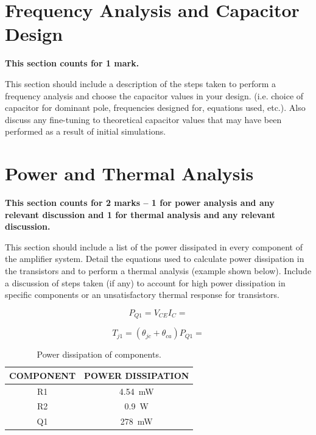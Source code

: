 \documentclass{article}
\begin{document}
\section{Frequency Analysis and Capacitor Design}
\textbf{This section counts for 1 mark.}

This section should include a description of the steps taken to perform a frequency analysis and choose the capacitor values in your design. (i.e. choice of capacitor for dominant pole, frequencies designed for, equations used, etc.). Also discuss any fine-tuning to theoretical capacitor values that may have been performed as a result of initial simulations.


\section{Power and Thermal Analysis}
\textbf{This section counts for 2 marks -- 1 for power analysis and any relevant discussion and 1 for thermal analysis and any relevant discussion.}

This section should include a list of the power dissipated in every component of the amplifier system. Detail the equations used to calculate power dissipation in the transistors and to perform a thermal analysis (example shown below). Include a discussion of steps taken (if any) to account for high power dissipation in specific components or an unsatisfactory thermal response for transistors.


\begin{equation} \label{eqn:pwr}
  P_{Q1} = V_{CE}I_{C} = 
\end{equation}

\begin{equation} \label{eqn:temp1}
  T_{j1} = \left(\theta_{jc}+\theta_{ca}\right)P_{Q1} = 
\end{equation}


\begin{table}[!htbp]
\centering
\begin{tabular}{ c | c } 
\hline
\textbf{COMPONENT} & \textbf{POWER DISSIPATION} \\
\hline
R1  &  \SI{4.54}{\milli\watt} \\
R2  &  \SI{0.9}{\watt} \\
Q1  &  \SI{278}{\milli\watt} \\
\hline
\end{tabular}
\caption{Power dissipation of components.}
\label{table:pwrdissipation}
\end{table}
\end{document}
